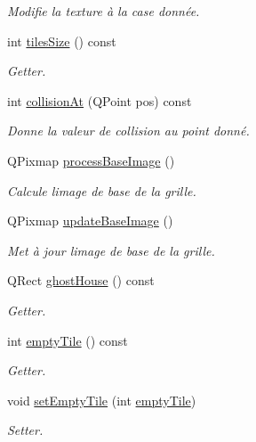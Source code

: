 \begin{DoxyCompactItemize}
\begin{DoxyCompactList}\small\item\em Modifie la texture à la case donnée. \end{DoxyCompactList}\item 
int \hyperlink{class_grid_af360f3f9d6df547d63829a3af47e5109}{tiles\+Size} () const 
\begin{DoxyCompactList}\small\item\em Getter. \end{DoxyCompactList}\item 
int \hyperlink{class_grid_a711ac8dd739f2fded9160f467be76bf4}{collision\+At} (Q\+Point pos) const 
\begin{DoxyCompactList}\small\item\em Donne la valeur de collision au point donné. \end{DoxyCompactList}\item 
Q\+Pixmap \hyperlink{class_grid_a4a021bb5b8a2210cb8a773ae23131090}{process\+Base\+Image} ()
\begin{DoxyCompactList}\small\item\em Calcule l\textquotesingle{}image de base de la grille. \end{DoxyCompactList}\item 
Q\+Pixmap \hyperlink{class_grid_a6186275b098df986400db17659895b23}{update\+Base\+Image} ()
\begin{DoxyCompactList}\small\item\em Met à jour l\textquotesingle{}image de base de la grille. \end{DoxyCompactList}\item 
Q\+Rect \hyperlink{class_grid_a96c1d1e403aa5e04aeb6b194795448c4}{ghost\+House} () const 
\begin{DoxyCompactList}\small\item\em Getter. \end{DoxyCompactList}\item 
int \hyperlink{class_grid_acc9b139189e4242de864c5bc7a60987c}{empty\+Tile} () const 
\begin{DoxyCompactList}\small\item\em Getter. \end{DoxyCompactList}\item 
void \hyperlink{class_grid_a8c6bd2ddd44b14bf887d5e0bfc7a6fb3}{set\+Empty\+Tile} (int \hyperlink{class_grid_acc9b139189e4242de864c5bc7a60987c}{empty\+Tile})
\begin{DoxyCompactList}\small\item\em Setter. \end{DoxyCompactList}\item 

\end{DoxyCompactItemize}
